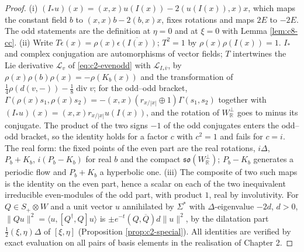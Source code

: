 \begin{proof}
(i) $(I_*u)(x)=(x,x)u(I(x))-2(u(I(x)),x)x$, which maps the constant field $b$ to $(x,x)b-2(b,x)x$, fixes rotations and maps $2E$ to $-2E$. The odd statements are the definition at $\eta=0$ and at $\xi=0$ with Lemma \ref{lem:c8-cc}. (ii) Write $T\epsilon(x)=\rho(x)\overline{\epsilon(I(x))}$; $T^2=1$ by $\rho(x)\rho(I(x))=1$. $I_*$ and complex conjugation are automorphisms of vector fields; $T$ intertwines the Lie derivative $\mathcal L_v$ of \eqref{eq:c2-evenodd} with $\mathcal L_{I_*\bar v}$, by $\rho(x)\rho(b)\rho(x)=-\rho(K_b(x))$ and the transformation of $\tfrac14\rho(d(v,-))-\tfrac18\operatorname{div}v$; for the odd--odd bracket, $\Gamma(\rho(x)s_1,\rho(x)s_2)=-(x,x)(r_{x/|x|}\oplus1)\Gamma(s_1,s_2)$ together with $(I_*u)(x)=(x,x)r_{x/|x|}u(I(x))$, and the rotation of $W_{\mathbb R}^\perp$ goes to minus its conjugate. The product of the two signs $-1$ of the odd conjugates enters the odd--odd bracket, so the identity holds for a factor $c$ with $c^2=1$ and fails for $c=i$. The real form: the fixed points of the even part are the real rotations, $i\Delta$, $P_b+K_b$, $i(P_b-K_b)$ for real $b$ and the compact $\mathfrak{so}(W_{\mathbb R}^\perp)$; $P_b-K_b$ generates a periodic flow and $P_b+K_b$ a hyperbolic one. (iii) The composite of two such maps is the identity on the even part, hence a scalar on each of the two inequivalent irreducible even-modules of the odd part, with product $1$, real by involutivity. For $Q\in S_+\otimes W$ and a unit vector $u$ annihilated by $\Sigma^*$ with $\Delta$-eigenvalue $-2d$, $d>0$, $\|Qu\|^2=\langle u,[Q^\dagger,Q]u\rangle$ is $\pm e^{-t}(Q,\overline Q)d\|u\|^2$, by the dilatation part $\tfrac12(\xi,\eta)\Delta$ of $[\xi,\eta]$ (Proposition \ref{prop:c2-special}). All identities are verified by exact evaluation on all pairs of basis elements in the realisation of Chapter 2.
\end{proof}

